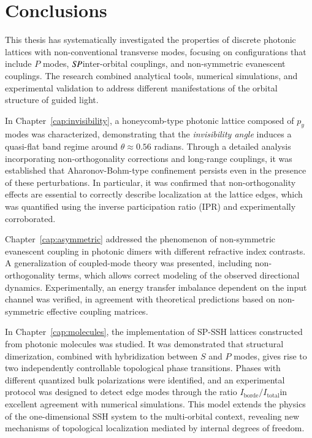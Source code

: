 \chapter{Conclusions}
\label{cap:conclu}

This thesis has systematically investigated the properties of discrete photonic lattices with non-conventional transverse modes, focusing on configurations that include \( P \) modes, \( S\hspace*{-0.3ex}P \)inter-orbital couplings, and non-symmetric evanescent couplings. The research combined analytical tools, numerical simulations, and experimental validation to address different manifestations of the orbital structure of guided light.

In Chapter~\ref{cap:invisibility}, a honeycomb-type photonic lattice composed of \( p_y \) modes was characterized, demonstrating that the \textit{invisibility angle} induces a quasi-flat band regime around \( \theta \approx 0.56 \) radians. Through a detailed analysis incorporating non-orthogonality corrections and long-range couplings, it was established that Aharonov-Bohm-type confinement persists even in the presence of these perturbations. In particular, it was confirmed that non-orthogonality effects are essential to correctly describe localization at the lattice edges, which was quantified using the inverse participation ratio (IPR) and experimentally corroborated.

Chapter~\ref{cap:asymmetric} addressed the phenomenon of non-symmetric evanescent coupling in photonic dimers with different refractive index contrasts. A generalization of coupled-mode theory was presented, including non-orthogonality terms, which allows correct modeling of the observed directional dynamics. Experimentally, an energy transfer imbalance dependent on the input channel was verified, in agreement with theoretical predictions based on non-symmetric effective coupling matrices.

In Chapter~\ref{cap:molecules}, the implementation of SP-SSH lattices constructed from photonic molecules was studied. It was demonstrated that structural dimerization, combined with hybridization between \( S \) and \( P \) modes, gives rise to two independently controllable topological phase transitions. Phases with different quantized bulk polarizations were identified, and an experimental protocol was designed to detect edge modes through the ratio \( I_{\text{borde}} / I_{\text{total}} \)in excellent agreement with numerical simulations. This model extends the physics of the one-dimensional SSH system to the multi-orbital context, revealing new mechanisms of topological localization mediated by internal degrees of freedom.

